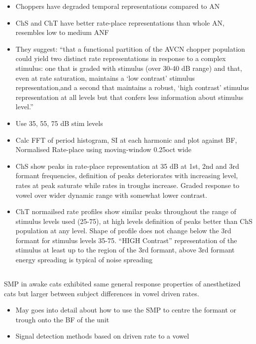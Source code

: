 \documentclass[10pt,a4paper]{article}
\begin{document}
\begin{itemize}
\item Choppers have degraded temporal representations compared to AN
\item ChS and ChT have better rate-place representations than whole AN,
  resembles low to medium ANF
\item They suggest: {\textquotedblleft}that a functional partition of the AVCN
  chopper population could yield two distinct rate representations in response
  to a complex stimulus: one that is graded with stimulus (over 30-40 dB range)
  and that, even at rate saturation, maintains a {\textquoteleft}low
  contrast{\textquoteright} stimulus representation,and a second that maintains
  a robust, {\textquoteleft}high contrast{\textquoteright} stimulus
  representation at all levels but that confers less information about stimulus
  level.{\textquotedblright}
\item Use 35, 55, 75 dB stim levels
\item Calc FFT of period histogram, SI at each harmonic and plot against BF,
  Normalised Rate-place using moving-window 0.25oct wide \citep{YoundSachs:1981}
\item ChS show peaks in rate-place representation at 35 dB at 1st, 2nd and 3rd
  formant frequencies, definition of peaks deteriorates with increasing level,
  rates at peak saturate while rates in troughs increase.  Graded response to
  vowel over wider dynamic range with somewhat lower contrast.
\item ChT normailsed rate profiles show similar peaks throughout the range of
  stimulus levels used (25-75), at high levels definition of peaks better than
  ChS population at any level.  Shape of profile does not change below the 3rd
  formant for stimulus levels 35-75.  {\textquotedblleft}HIGH
  Contrast{\textquotedblright} representation of the stimulus at least up to the
  region of the 3rd formant, above 3rd formant energy spreading is typical of
  noise spreading
\end{itemize}

\subsection{\citep{MayPrellEtAl:1998}}

SMP in awake cats exhibited same general response properties of anesthetized
cats but larger between subject differences in vowel driven rates.


\begin{itemize}
\item May goes into detail about how to use the SMP to centre the formant or
  trough onto the BF of the unit
\item Signal detection methods based on driven rate to a vowel
\end{itemize}
\end{document}
